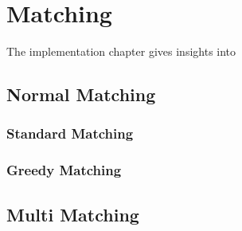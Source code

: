 \chapter{Matching}\label{chap:devel}

The implementation chapter gives insights into 

\section{Normal Matching}
\subsection{Standard Matching}

\subsection{Greedy Matching}


\section{Multi Matching}

